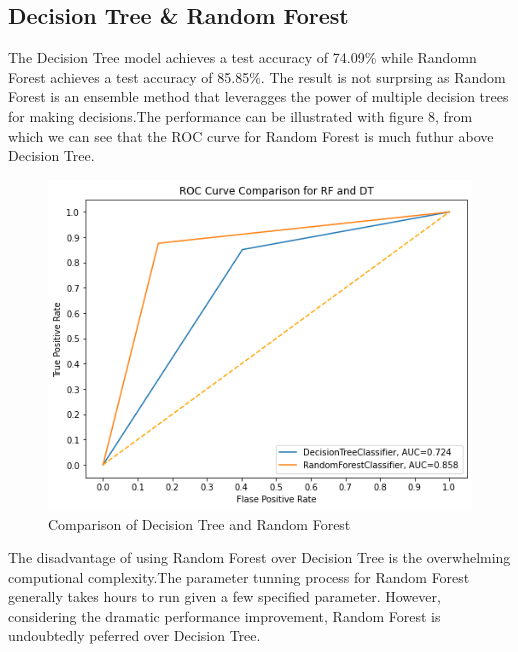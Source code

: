 \documentclass[10pt,twocolumn,letterpage]{article}
\begin{document}
		\subsection{Decision Tree \& Random Forest}
		The Decision Tree model achieves a test accuracy of 74.09\% while Randomn Forest achieves a test accuracy of 85.85\%. The result is not surprsing as Random Forest is an ensemble method that leveragges the power of multiple decision trees for making decisions.The performance can be illustrated with figure 8, from which we can see that the ROC curve for Random Forest is much futhur above Decision Tree. 
		\begin{figure}[htbp]
			\includegraphics[width=\columnwidth]{ROC_RF_DT}
			\caption{Comparison of Decision Tree and Random Forest}\label{ROC_RF_DT}
		\end{figure} 
		The disadvantage of using Random Forest over Decision Tree is the overwhelming computional complexity.The parameter tunning process for Random Forest generally takes hours to run given a few specified parameter. However, considering the dramatic performance improvement, Random Forest is undoubtedly peferred over Decision Tree.
\end{document}

